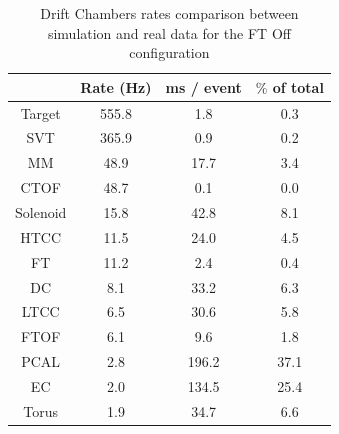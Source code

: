 \begin{table}[h]
	\begin{center}
		\begin{tabular}{ c | c | c | c }
			 & Rate (Hz) &  ms / event &  $\%$ of total\\
			\hline
Target   &  555.8  &   1.8   & 0.3  \\
SVT      &  365.9  &   0.9   & 0.2  \\
MM       &  48.9   &   17.7  & 3.4  \\
CTOF     &  48.7   &   0.1   & 0.0  \\
Solenoid &  15.8   &   42.8  & 8.1  \\
HTCC     &  11.5   &   24.0  & 4.5  \\
FT       &  11.2   &   2.4   & 0.4  \\
DC       &  8.1    &   33.2  & 6.3  \\
LTCC     &  6.5    &   30.6  & 5.8  \\
FTOF     &  6.1    &   9.6   & 1.8  \\
PCAL     &  2.8    &   196.2 & 37.1 \\
EC       &  2.0    &   134.5 & 25.4 \\
Torus    &  1.9    &   34.7  & 6.6  \\
		\end{tabular}
	\end{center}
	\caption{Drift Chambers rates comparison between simulation and real data for the FT Off configuration}\label{tab:benchmarks}
\end{table}

































